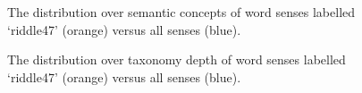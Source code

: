 \begin{figure}[htbp]
	\caption[]{\label{fig:Stolk2021a:Fig15} The distribution over semantic concepts of word senses labelled ‘riddle47’ (orange) versus all senses (blue).}
\end{figure}

\begin{figure}[htbp]
	\caption[]{\label{fig:Stolk2021a:Fig16} The distribution over taxonomy depth of word senses labelled ‘riddle47’ (orange) versus all senses (blue).}
\end{figure}

